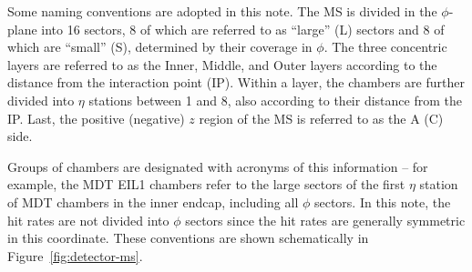 Some naming conventions are adopted in this note. The MS is divided in the $\phi$-plane into 16 sectors, 8 of which are referred to as ``large'' (L) sectors and 8 of which are ``small'' (S), determined by their coverage in $\phi$. The three concentric layers are referred to as the Inner, Middle, and Outer layers according to the distance from the interaction point (IP). Within a layer, the chambers are further divided into $\eta$ stations between 1 and 8, also according to their distance from the IP. Last, the positive (negative) $z$ region of the MS is referred to as the A (C) side.

Groups of chambers are designated with acronyms of this information -- for example, the MDT EIL1 chambers refer to the large sectors of the first $\eta$ station of MDT chambers in the inner endcap, including all $\phi$ sectors. In this note, the hit rates are not divided into $\phi$ sectors since the hit rates are generally symmetric in this coordinate. These conventions are shown schematically in Figure~\ref{fig:detector-ms}.

